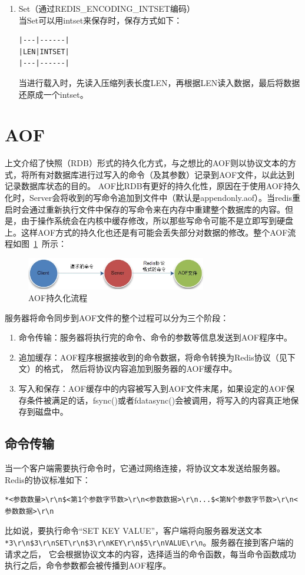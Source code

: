 \documentclass{zjutthesis}
\begin{document}
\begin{enumerate}[label=\arabic*.]
\item{
Set（通过REDIS\_ENCODING\_INTSET编码）\\
当Set可以用intset来保存时，保存方式如下：
\begin{verbatim}
|---|------|
|LEN|INTSET|
|---|------|
\end{verbatim}
当进行载入时，先读入压缩列表长度LEN，再根据LEN读入数据，最后将数据还原成一个intset。
}
\end{enumerate}


\section{AOF}
上文介绍了快照（RDB）形式的持久化方式，与之想比的AOF则以协议文本的方式，将所有对数据库进行过写入的命令（及其参数）记录到AOF文件，以此达到记录数据库状态的目的。
AOF比RDB有更好的持久化性，原因在于使用AOF持久化时，Server会将收到的写命令追加到文件中（默认是appendonly.aof）。当redis重启时会通过重新执行文件中保存的写命令来在内存中重建整个数据库的内容。但是，由于操作系统会在内核中缓存修改，所以那些写命令可能不是立即写到硬盘上。这样AOF方式的持久化也还是有可能会丢失部分对数据的修改。整个AOF流程如图~\ref{fig:AOF}~所示：
\begin{figure}[H]
\centering
\includegraphics[width=0.7\textwidth]{AOF}
\caption{AOF持久化流程}\label{fig:AOF}
\vspace{\baselineskip} %
\end{figure}

服务器将命令同步到AOF文件的整个过程可以分为三个阶段：
\begin{enumerate}[label=\arabic*.]
\item{命令传输：服务器将执行完的命令、命令的参数等信息发送到AOF程序中。}
\item{追加缓存：AOF程序根据接收到的命令数据，将命令转换为Redis协议（见下文）的格式，
然后将协议内容追加到服务器的AOF缓存中。}
\item{写入和保存：AOF缓存中的内容被写入到AOF文件末尾，如果设定的AOF保存条件被满足的话，fsync()或者fdatasync()会被调用，将写入的内容真正地保存到磁盘中。}
\end{enumerate}

\subsection{命令传输}
当一个客户端需要执行命令时，它通过网络连接，将协议文本发送给服务器。Redis的协议标准如下：
\begin{verbatim}
*<参数数量>\r\n$<第1个参数字节数>\r\n<参数数据>\r\n...$<第N个参数字节数>\r\n<参数数据>\r\n
\end{verbatim}
比如说，要执行命令“SET KEY VALUE”，客户端将向服务器发送文本\verb|*3\r\n$3\r\nSET\r\n$3\r\nKEY\r\n$5\r\nVALUE\r\n|。服务器在接到客户端的请求之后，
它会根据协议文本的内容，选择适当的命令函数，每当命令函数成功执行之后，命令参数都会被传播到AOF程序。
\end{document}
